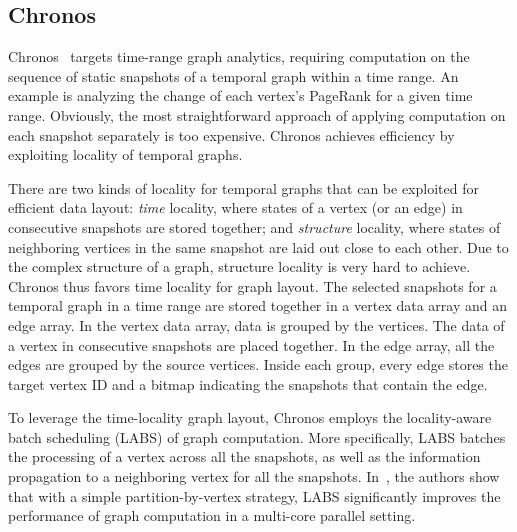 \documentclass{svjour3}
\begin{document}
\subsection{Chronos}\label{sec:chronos}

Chronos~\cite{chronos} targets time-range graph analytics, requiring computation on the sequence of static snapshots of a temporal graph within a time range. An example is analyzing the change of each vertex's PageRank for a given time range. Obviously, the most straightforward approach of applying computation on each snapshot separately is too expensive. Chronos achieves efficiency by exploiting locality of temporal graphs.

\vspace{2mm}

 There are two kinds of locality for temporal graphs that can be exploited for efficient data layout: \emph{time} locality, where states of a vertex (or an edge) in consecutive snapshots are stored together; and \emph{structure} locality, where states of neighboring vertices in the same snapshot are laid out close to each other. Due to the complex structure of a graph, structure locality is very hard to achieve. Chronos thus favors time locality for graph layout. The selected snapshots for a temporal graph in a time range are stored together in a vertex data array and an edge array. In the vertex data array, data is grouped by the vertices. The data of a vertex in consecutive snapshots are placed together. In the edge array, all the edges are grouped by the source vertices. Inside each group, every edge stores the target vertex ID and a bitmap indicating the snapshots that contain the edge. 

\vspace{2mm}

 To leverage the time-locality graph layout, Chronos employs the locality-aware batch scheduling (LABS) of graph computation. More specifically, LABS batches the processing of a vertex across all the snapshots, as well as the information propagation to a neighboring vertex for all the snapshots. %
In~\cite{chronos}, the authors show that with a simple partition-by-vertex strategy, LABS significantly improves the performance of graph computation in a multi-core parallel setting.
\end{document}
